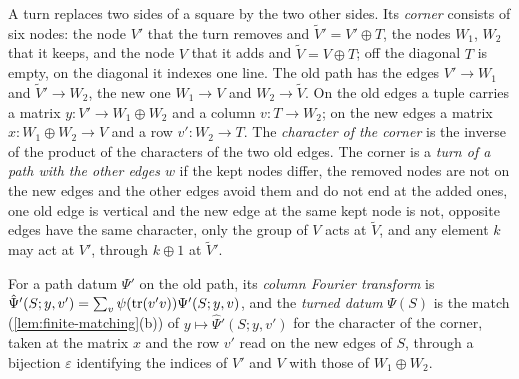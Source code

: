 
A turn replaces two sides of a square by the two other sides. Its \emph{corner} consists of six nodes: the node $V'$ that the turn removes and $\tilde V'=V'\oplus T$, the nodes $W_1$, $W_2$ that it keeps, and the node $V$ that it adds
and $\tilde V=V\oplus T$; off the diagonal $T$ is empty, on the diagonal it indexes one line. The old path has the edges $V'\to W_1$ and $\tilde V'\to W_2$, the new one $W_1\to V$ and $W_2\to\tilde V$. On the old edges a tuple carries a matrix
$y\colon V'\to W_1\oplus W_2$ and a column $v\colon T\to W_2$; on the new edges a matrix $x\colon W_1\oplus W_2\to V$ and a row $v'\colon W_2\to T$. The \emph{character of the corner} is the inverse of the product of the characters of the two
old edges. The corner is a \emph{turn of a path with the other edges $w$} if the kept nodes differ, the removed nodes are not on the new edges and the other edges avoid them and do not end at the added ones, one
old edge is vertical and the new edge at the same kept node is not, opposite edges have the same character, only the group of $V$ acts at $\tilde V$, and any element $k$ may act at $V'$, through $k\oplus1$ at $\tilde V'$.

For a path datum $\Psi'$ on the old path, its \emph{column Fourier transform} is $\hat\Psi'(S;y,v')=\sum_v\psi(\operatorname{tr}(v'v))\Psi'(S;y,v)$, and the \emph{turned datum} $\Psi(S)$ is the match (\cref{lem:finite-matching}(b)) of $y\mapsto\hat\Psi'(S;y,v')$
for the character of the corner, taken at the matrix $x$ and the row $v'$ read on the new edges of $S$, through a bijection $\varepsilon$ identifying the indices of $V'$ and $V$ with those of $W_1\oplus W_2$.

